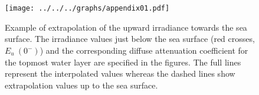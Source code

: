 \documentclass[essd, manuscript]{copernicus}
\begin{document}
\appendix
\section{}    %

\subsection{}     %


\noappendix       %




\appendixfigures  %

\begin{figure}[htp]
    \texttt{[image: ../../../graphs/appendix01.pdf]}
    \caption{Example of extrapolation of the upward irradiance towards the sea surface. The irradiance values just below the sea surface (red crosses, $E_u~(0^{-})$) and the corresponding diffuse attenuation coefficient for the topmost water layer are specified in the figures. The full lines represent the interpolated values whereas the dashed lines show extrapolation values up to the sea surface.}
\end{figure}

\appendixtables   %




\end{document}
